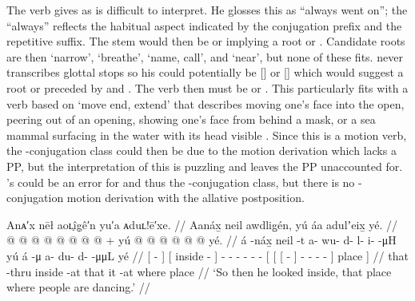 The verb \citeauthor{swanton:1909} gives as  is difficult to interpret.
He glosses this as “always went on”; the “always” reflects the habitual aspect indicated by the  conjugation prefix and the repetitive  suffix.
The stem would then be  or  implying a root  or .
Candidate roots are then  ‘narrow’,  ‘breathe’,  ‘name, call’, and  ‘near’, but none of these fits.
\citeauthor{swanton:1909} never transcribes glottal stops so his  could potentially be  [] or  [] which would suggest a root  or  preceded by  and .
The verb then must be  or .
This particularly fits with a verb based on  ‘move end, extend’ that describes moving one’s face into the open, peering out of an opening, showing one’s face from behind a mask, or a sea mammal surfacing in the water with its head visible \parencites[02/16–20]{leer:1973}[72]{leer:1976}.
Since this is a motion verb, the -conjugation class could then be due to the motion derivation  which lacks a PP, but the interpretation of this is puzzling and leaves the PP  unaccounted for.
\citeauthor{swanton:1909}’s  could be an error for  and thus the -conjugation class, but there is no -conjugation motion derivation with the allative  postposition.

\ex\label{ex:100-54-show-face-dancing}%
%
\begingl
	\glpreamble	Anᴀ′x nēł aoʟ̣îg̣ê′n yu′a ᴀduʟ!ē′xe. //
	\glpreamble	Aanáx̱ neil awdlig̱én, yú áa adulʼeix̱ yé. //
	\gla	{}  @ {} {}
		{}  @ {} {}
		 @ {} @ {} @ {} @ {} @ {} @ {} +
		{} yú {} {}  @ {} {} 
			 @ {} @ {} @ {} @ {} @ {} {} 
			yé. {} //
	\glb	{} á -náx̱ {} 
		{} neil -t {}
		a- wu- d- l- i-  -μH
		{} yú {} {} á -μ {}
			a- du- d-  -μμL {} {}
			yé {} //
	\glc	{}[  - {}]
		{}[ inside - {}]
		- - - - -  -
		{}[  {}[ {}[  - {}]
			- - -  - \· {}]
			place {}] //
	\gld	{} that -thru {}
		{} inside -at {} 
		 {} {} {} {} {} {} 
		{} that {} {} it -at {}
			 {} {} {} {} \·where {}
			place {} //
	\glft	‘So then he looked inside, that place where people are dancing.’
		//
\endgl
\xe

